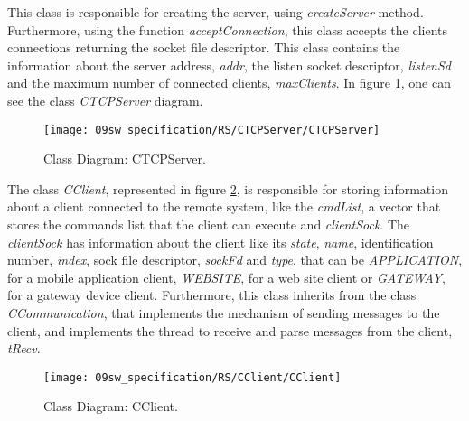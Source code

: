 
This class is responsible for creating the server, using \textit{createServer} method. Furthermore, using the function \textit{acceptConnection}, this class accepts the clients connections returning the socket file descriptor. This class contains the information about the server address, \textit{addr}, the listen socket descriptor, \textit{listenSd} and the maximum number of connected clients, \textit{maxClients}. In figure \ref{fig:CTCPServer}, one can see the class \textit{CTCPServer} diagram.

\begin{figure}[H]
	\centering
	\texttt{[image: 09sw\_specification/RS/CTCPServer/CTCPServer]}
	\caption{Class Diagram: CTCPServer.}
	\label{fig:CTCPServer}
\end{figure}


The class \textit{CClient}, represented in figure \ref{fig:CClient}, is responsible for storing information about a client connected to the remote system, like the \textit{cmdList}, a vector that stores the commands list that the client can execute and \textit{clientSock}. The \textit{clientSock} has information about the client like its \textit{state}, \textit{name}, identification number, \textit{index}, sock file descriptor, \textit{sockFd} and \textit{type}, that can be \textit{APPLICATION}, for a mobile application client, \textit{WEBSITE}, for a web site client or \textit{GATEWAY}, for a gateway device client. Furthermore, this class inherits from the class \textit{CCommunication}, that implements the mechanism of sending messages to the client, and implements the thread to receive and parse messages from the client, \textit{tRecv}. 

\begin{figure}[H]
	\centering
	\texttt{[image: 09sw\_specification/RS/CClient/CClient]}
	\caption{Class Diagram: CClient.}
	\label{fig:CClient}
\end{figure}



